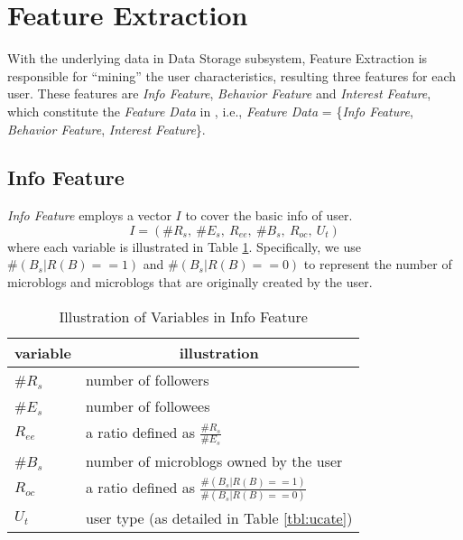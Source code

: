 

\section{Feature Extraction}
\label{sec:fe}

With the underlying data in Data Storage subsystem, Feature Extraction is responsible for ``mining'' the user characteristics, resulting three features for each user.
These features are \textit{Info Feature}, \textit{Behavior Feature} and \textit{Interest Feature}, which constitute the \textit{Feature Data} in \sys{}, i.e., \textit{Feature Data} = \{\textit{Info Feature}, \textit{Behavior Feature}, \textit{Interest Feature}\}.

\subsection{Info Feature}

\textit{Info Feature} employs a vector $I$ to cover the basic info of user.
\begin{equation}
\label{eq:info}
	I = (\#R_s,\ \#E_s,\ R_{ee},\ \#B_s,\ R_{oc},\ U_t)
\end{equation}
where each variable is illustrated in Table \ref{tbl:fe-info}.
Specifically, we use $\#(B_s | R(B)==1)$ and $\#(B_s | R(B)==0)$ to represent the number of \retd{} microblogs and microblogs that are originally created by the user.

\begin{table}[!htb]
\centering
\begin{small}
\caption{Illustration of Variables in Info Feature}
\vspace{0.3cm}
\label{tbl:fe-info}
\begin{tabular}{ll}
\toprule
\multicolumn{1}{c}{\textbf{variable}} & \multicolumn{1}{c}{\textbf{illustration}}	\\	\midrule \midrule
\#$R_s$				& number of followers				\\	\midrule
\#$E_s$				& number of followees				\\	\midrule
\multirow{2}{*}{$R_{ee}$}      & \multirow{2}{*}{a ratio defined as $\frac{\#R_s}{\#E_s}$}	\\
 						&                       									\\	\midrule
\#$B_s$				& number of microblogs owned by the user				\\	\midrule
\multirow{2}{*}{$R_{oc}$}      & \multirow{2}{*}{a ratio defined as $\frac{\#(B_s | R(B)==1)}{\#(B_s | R(B)==0)}$}	\\
 						&                       									\\	\midrule
$U_t$					& user type (as detailed in Table \ref{tbl:ucate})			\\ \bottomrule
\end{tabular}
\end{small}
\end{table}


